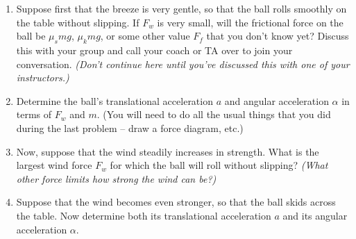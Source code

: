 \documentclass[12pt]{article}
\begin{document}
\begin{enumerate}

\item Suppose first that the breeze is very gentle, so that the ball rolls smoothly on the table without slipping. If $F_w$ is very small, will the frictional force on the ball be $\mu_s mg$, $\mu_k mg$, or some other value $F_f$ that you don't know yet? Discuss this with your group and call your coach or TA over to join your conversation. {\it (Don't continue here until you've discussed this with one of your instructors.)}

\bigskip

\item Determine the ball's translational acceleration $a$ and angular acceleration $\alpha$ in terms of $F_w$ and $m$. (You will need to do all the usual things that you did during the last problem -- draw a force diagram, etc.) 

\newpage

\item Now, suppose that the wind steadily increases in strength. What is the largest wind force $F_w$ for which the ball will roll without slipping? {\it (What other force limits how strong the wind can be?)}


\vspace{4.5in}

\item Suppose that the wind becomes even stronger, so that the ball skids across the table. Now determine both its translational acceleration $a$ and its angular acceleration $\alpha$.
\end{enumerate}
\end{document}
